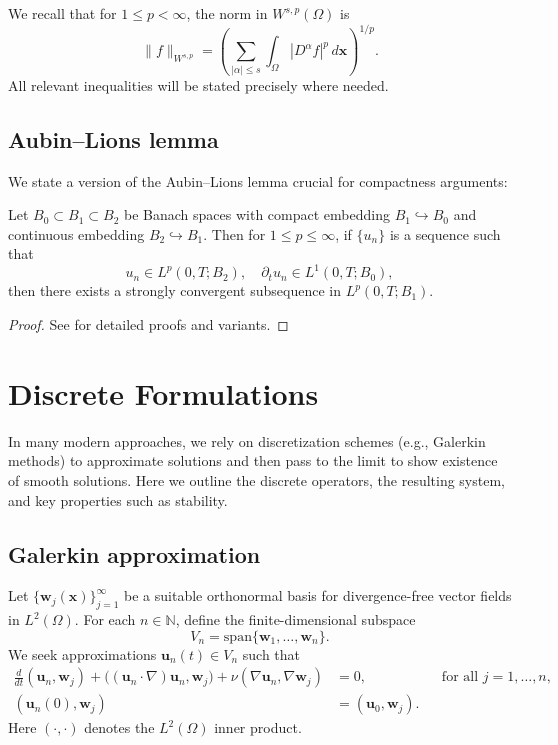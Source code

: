 \documentclass[11pt]{article}
\numberwithin{equation}{section}
\begin{document}
We recall that for \(1 \leq p < \infty\), the norm in \(W^{s,p}(\Omega)\) is
\[
\| f \|_{W^{s,p}} = \left(
   \sum_{|\alpha|\le s} \int_\Omega |D^\alpha f|^p \, d\mathbf{x}
\right)^{1/p}.
\]
All relevant inequalities will be stated precisely where needed.

\subsection{Aubin--Lions lemma}

We state a version of the Aubin--Lions lemma crucial for compactness arguments:

\begin{lemma}
\label{lemma:aubin_lions}
Let \(B_0 \subset B_1 \subset B_2\) be Banach spaces with compact embedding
\(B_1 \hookrightarrow B_0\) and continuous embedding \(B_2 \hookrightarrow B_1\).
Then for \(1 \leq p \leq \infty\), if \(\{u_n\}\) is a sequence such that
\[
u_n \in L^p(0,T;B_2), \quad
\partial_t u_n \in L^1(0,T;B_0),
\]
then there exists a strongly convergent subsequence in \(L^p(0,T;B_1)\).
\end{lemma}

\begin{proof}
See \cite{ConstantinFoias,Temam} for detailed proofs and variants.
\end{proof}

\section{Discrete Formulations}\label{sec:discrete}

In many modern approaches, we rely on discretization schemes (e.g., Galerkin methods)
to approximate solutions and then pass to the limit to show existence of smooth
solutions. Here we outline the discrete operators, the resulting system, and
key properties such as stability.

\subsection{Galerkin approximation}

Let \(\{\mathbf{w}_j(\mathbf{x})\}_{j=1}^\infty\) be a suitable orthonormal basis
for divergence-free vector fields in \(L^2(\Omega)\).
For each \(n\in \mathbb{N}\), define the finite-dimensional subspace
\[
V_n = \mathrm{span}\{\mathbf{w}_1, \dots, \mathbf{w}_n\}.
\]
We seek approximations \(\mathbf{u}_n(t) \in V_n\) such that
\begin{equation}\label{eq:Galerk}
\begin{aligned}
\frac{d}{dt}(\mathbf{u}_n,\mathbf{w}_j)
+ \bigl((\mathbf{u}_n\cdot \nabla)\mathbf{u}_n,\mathbf{w}_j\bigr)
+ \nu(\nabla \mathbf{u}_n,\nabla \mathbf{w}_j)
&= 0,
&& \text{for all } j = 1,\ldots,n, \\
(\mathbf{u}_n(0), \mathbf{w}_j) &= (\mathbf{u}_0,\mathbf{w}_j).
\end{aligned}
\end{equation}
Here \((\cdot,\cdot)\) denotes the \(L^2(\Omega)\) inner product.
\end{document}
